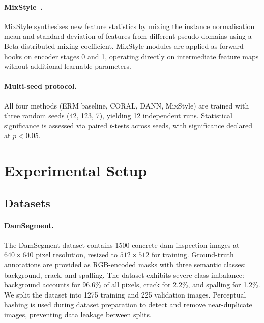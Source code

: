 \documentclass[preprint,12pt]{elsarticle}
\begin{document}
\paragraph{MixStyle~\cite{zhou2021mixstyle, zhou2023mixstyle}.}
MixStyle synthesises new feature statistics by mixing the instance normalisation mean and standard deviation of features from different pseudo-domains using a Beta-distributed mixing coefficient. MixStyle modules are applied as forward hooks on encoder stages 0 and 1, operating directly on intermediate feature maps without additional learnable parameters.

\paragraph{Multi-seed protocol.}
All four methods (ERM baseline, CORAL, DANN, MixStyle) are trained with three random seeds (42, 123, 7), yielding 12 independent runs. Statistical significance is assessed via paired $t$-tests across seeds, with significance declared at $p < 0.05$.



\section{Experimental Setup}
\label{sec:experimental_setup}

\subsection{Datasets}
\label{sec:datasets}

\paragraph{DamSegment.}
The DamSegment dataset contains 1500 concrete dam inspection images at $640 \times 640$ pixel resolution, resized to $512 \times 512$ for training. Ground-truth annotations are provided as RGB-encoded masks with three semantic classes: background, crack, and spalling. The dataset exhibits severe class imbalance: background accounts for 96.6\% of all pixels, crack for 2.2\%, and spalling for 1.2\%. We split the dataset into 1275 training and 225 validation images. Perceptual hashing is used during dataset preparation to detect and remove near-duplicate images, preventing data leakage between splits.
\end{document}
